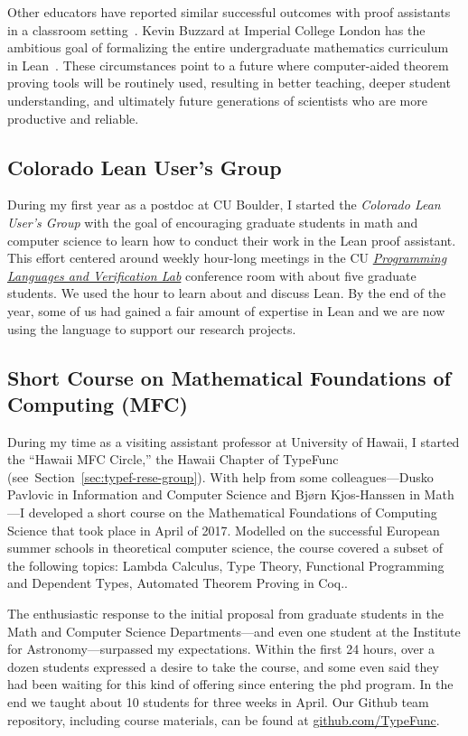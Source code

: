 Other educators have reported similar successful outcomes with proof assistants in a classroom setting~\cite{nipkow:2012,pierce:2009}. Kevin Buzzard at Imperial College London has the ambitious goal of formalizing the entire undergraduate mathematics curriculum in Lean~\cite{buzzard}. These circumstances point to a future where computer-aided theorem proving tools will be routinely used, resulting in better teaching, deeper student understanding, and ultimately future generations of scientists who are more productive and reliable.

\newpage

\subsection{Colorado Lean User's Group} During my first year as a postdoc at CU Boulder, I started the \emph{Colorado Lean User's Group} with the goal of encouraging graduate students in math and computer science to learn how to conduct their work in the Lean proof assistant. This effort centered around weekly hour-long meetings in the CU \emph{\href{https://plv.colorado.edu/}{Programming Languages and Verification Lab}} conference room with about five graduate students. We used the hour to learn about and discuss Lean.  By the end of the year, some of us had gained a fair amount of expertise in Lean and we are now using the language to support our research projects.

\bigskip

\subsection{Short Course on Mathematical Foundations of Computing (MFC)} During my time as a visiting assistant professor at University of Hawaii, I started the ``Hawaii MFC Circle,'' the Hawaii Chapter of TypeFunc (see~Section~\ref{sec:typef-rese-group}). With  help from some colleagues---Dusko Pavlovic in Information and Computer Science and Bj{\o}rn Kjos-Hanssen in Math---I developed a short course on the Mathematical Foundations of Computing Science that took place in April of 2017. Modelled on the successful European summer schools in theoretical computer science, the course covered a subset of the following topics: Lambda Calculus, Type Theory,
Functional Programming and Dependent Types, Automated Theorem Proving in Coq..

The enthusiastic response to the initial proposal from graduate students in the Math and Computer Science Departments---and even one student at the Institute for Astronomy---surpassed my expectations. Within the first 24 hours, over a dozen students expressed a desire to take the course, and some even said they had been waiting for this kind of offering since entering the phd program. In the end we taught about 10 students for three weeks in April.  Our Github team repository, including course materials, can be found at \href{https://github.com/TypeFunc}{github.com/TypeFunc}.

